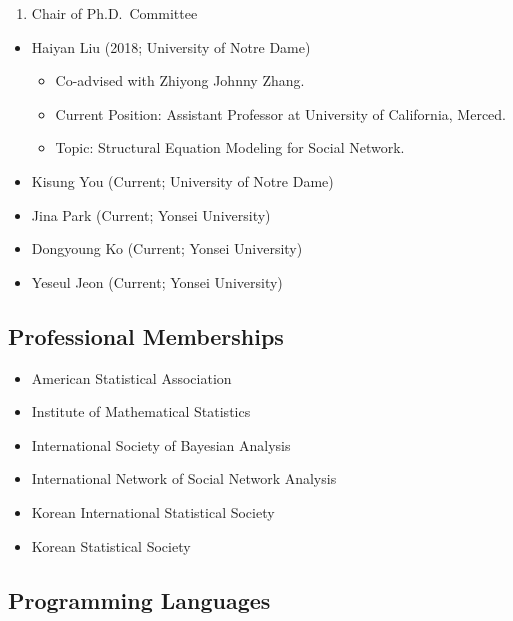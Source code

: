 \documentclass[
]{book}
\providecommand{\tightlist}{%
  \setlength{\itemsep}{0pt}\setlength{\parskip}{0pt}}
\begin{document}
\begin{enumerate}
\def\labelenumi{\arabic{enumi}.}
\setcounter{enumi}{1}
\tightlist
\item
  Chair of Ph.D.~Committee
\end{enumerate}

\begin{itemize}
\tightlist
\item
  Haiyan Liu (2018; University of Notre Dame)

  \begin{itemize}
  \tightlist
  \item
    Co-advised with Zhiyong Johnny Zhang.
  \item
    Current Position: Assistant Professor at University of California, Merced.
  \item
    Topic: Structural Equation Modeling for Social Network.
  \end{itemize}
\item
  Kisung You (Current; University of Notre Dame)
\item
  Jina Park (Current; Yonsei University)
\item
  Dongyoung Ko (Current; Yonsei University)
\item
  Yeseul Jeon (Current; Yonsei University)
\end{itemize}

\hypertarget{professional-memberships}{%
\subsection*{Professional Memberships}\label{professional-memberships}}

\begin{itemize}
\tightlist
\item
  American Statistical Association
\item
  Institute of Mathematical Statistics
\item
  International Society of Bayesian Analysis
\item
  International Network of Social Network Analysis
\item
  Korean International Statistical Society
\item
  Korean Statistical Society
\end{itemize}

\hypertarget{programming-languages}{%
\subsection*{Programming Languages}\label{programming-languages}}
\end{document}
